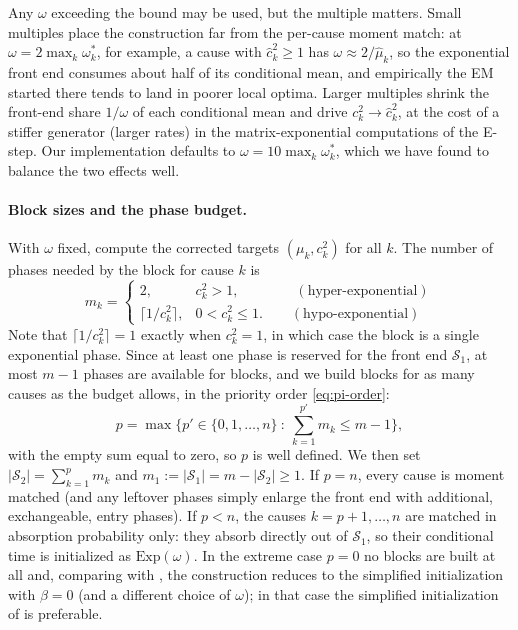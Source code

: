 \documentclass{article}
\newcommand{\cs}{\mathcal{S}}
\begin{document}
Any $\omega$ exceeding the bound may be used, but the multiple matters. Small multiples place the construction far from the per-cause moment match: at $\omega = 2\max_k \omega^*_k$, for example, a cause with $\hat{c}_k^2 \ge 1$ has $\omega \approx 2/\hat{\mu}_k$, so the exponential front end consumes about half of its conditional mean, and empirically the EM started there tends to land in poorer local optima. Larger multiples shrink the front-end share $1/\omega$ of each conditional mean and drive $c_k^2 \to \hat{c}_k^2$, at the cost of a stiffer generator (larger rates) in the matrix-exponential computations of the E-step. Our implementation defaults to $\omega = 10\max_k \omega^*_k$, which we have found to balance the two effects well.

\paragraph{Block sizes and the phase budget.} With $\omega$ fixed, compute the corrected targets $(\mu_k, c_k^2)$ for all $k$. The number of phases needed by the block for cause $k$ is
\begin{equation}\label{eq:num_phase}
m_{k} = \begin{cases}
2, & c^2_{k}  > 1, \qquad\qquad (\text{hyper-exponential})\\[0.5ex]
\big\lceil 1/c^2_{k} \big\rceil, & 0 < c^2_k \le 1. \qquad (\text{hypo-exponential})
\end{cases}
\end{equation}
Note that $\lceil 1/c_k^2 \rceil = 1$ exactly when $c_k^2 = 1$, in which case the block is a single exponential phase. Since at least one phase is reserved for the front end $\cs_1$, at most $m-1$ phases are available for blocks, and we build blocks for as many causes as the budget allows, in the priority order \eqref{eq:pi-order}:
\begin{equation}
\label{eq:num-fitted}
p = \max\Big\{p' \in \{0,1,\ldots,n\} ~:~ \sum_{k=1}^{p'} m_k \le m-1\Big\},
\end{equation}
with the empty sum equal to zero, so $p$ is well defined. We then set $|\cs_2| = \sum_{k=1}^p m_k$ and $m_1 := |\cs_1| = m - |\cs_2| \ge 1$. If $p = n$, every cause is moment matched (and any leftover phases simply enlarge the front end with additional, exchangeable, entry phases). If $p < n$, the causes $k = p+1,\ldots,n$ are matched in absorption probability only: they absorb directly out of $\cs_1$, so their conditional time is initialized as $\mathrm{Exp}(\omega)$. In the extreme case $p = 0$ no blocks are built at all and, comparing with , the construction reduces to the simplified initialization with $\beta = 0$ (and a different choice of $\omega$); in that case the simplified initialization of  is preferable.
\end{document}
